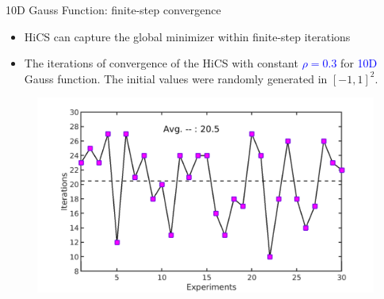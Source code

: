 \documentclass{beamer}
\begin{document}
\begin{frame}{10D Gauss Function: finite-step convergence}
\footnotesize{
	\begin{itemize}
		\item HiCS can capture the global minimizer within finite-step iterations
		\item{The iterations of convergence of the HiCS with
			constant \textcolor{blue}{$\rho=0.3$} for
			\textcolor{blue}{10D} Gauss function. The initial
			values were randomly generated in $[-1,1]^2$.}
	\end{itemize}
	}
	\vspace{-0.6cm}
\begin{figure}[!htbp]
	\centering
	  \includegraphics[scale=0.22]{./figures/gauss10Drandr0_3.png}
\end{figure}
\end{frame}
\end{document}
